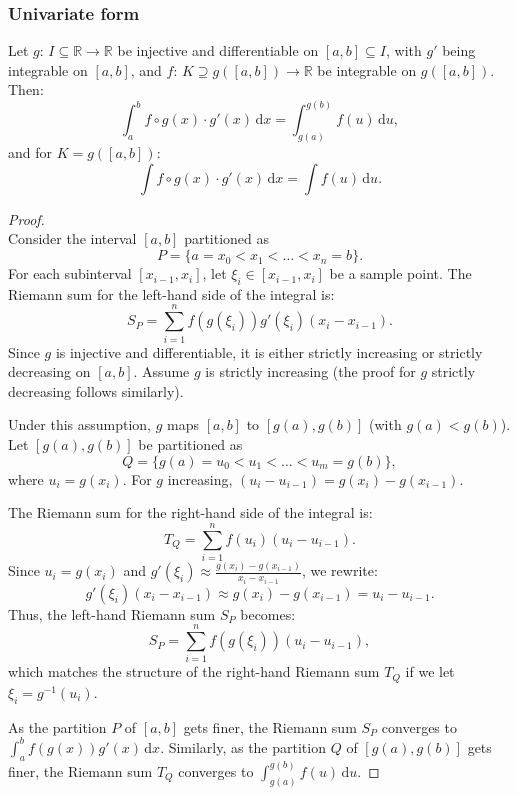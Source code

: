 \documentclass[a4paper,12pt]{report}
\begin{document}
\begin{itemize}
\begin{itemize}
\subsubsection{Univariate form}
Let $g:\,I\subseteq\mathbb{R}\to\mathbb{R}$ be injective and differentiable on $[a,b]\subseteq I$, with $g'$ being integrable on $[a,b]$, and $f:\,K\supseteq g([a,b])\to\mathbb{R}$ be integrable on $g([a,b])$. Then:
\[\int_a^bf\circ g(x)\cdot g'(x)\,\mathrm{d}x=\int_{g(a)}^{g(b)}f(u)\,\mathrm{d}u,\]
and for $K=g([a,b])$:
\[\int f\circ g(x)\cdot g'(x)\,\mathrm{d}x=\int f(u)\,\mathrm{d}u.\]
\begin{proof}\mbox{}\\
Consider the interval \([a, b]\) partitioned as
\[P = \{a = x_0 < x_1 < \dots  < x_n = b\}.\]
For each subinterval \([x_{i-1}, x_i]\), let \(\xi_i \in [x_{i-1}, x_i]\) be a sample point. The Riemann sum for the left-hand side of the integral is:
\[S_P = \sum_{i=1}^n f(g(\xi_i)) g'(\xi_i) (x_i - x_{i-1}).\]
Since \(g\) is injective and differentiable, it is either strictly increasing or strictly decreasing on \([a, b]\). Assume \(g\) is strictly increasing (the proof for \(g\) strictly decreasing follows similarly).

Under this assumption, \(g\) maps \([a, b]\) to \([g(a), g(b)]\) (with \(g(a) < g(b)\)). Let \([g(a), g(b)]\) be partitioned as
\[Q = \{g(a) = u_0 < u_1 < \dots  < u_m = g(b)\},\]
where \(u_i = g(x_i)\). For \(g\) increasing, \((u_i - u_{i-1}) = g(x_i) - g(x_{i-1})\).

The Riemann sum for the right-hand side of the integral is:
\[T_Q = \sum_{i=1}^n f(u_i) (u_i - u_{i-1}).\]
Since \(u_i = g(x_i)\) and \(g'(\xi_i) \approx \frac{g(x_i) - g(x_{i-1})}{x_i - x_{i-1}}\), we rewrite:
\[ g'(\xi_i) (x_i - x_{i-1}) \approx g(x_i) - g(x_{i-1}) = u_i - u_{i-1}. \]
Thus, the left-hand Riemann sum \(S_P\) becomes:
\[ S_P = \sum_{i=1}^n f(g(\xi_i)) (u_i - u_{i-1}),\]
which matches the structure of the right-hand Riemann sum \(T_Q\) if we let \(\xi_i = g^{-1}(u_i)\).

As the partition \(P\) of \([a, b]\) gets finer, the Riemann sum \(S_P\) converges to \(\int_a^b f(g(x)) g'(x) \, \mathrm{d}x\). Similarly, as the partition \(Q\) of \([g(a), g(b)]\) gets finer, the Riemann sum \(T_Q\) converges to \(\int_{g(a)}^{g(b)} f(u) \, \mathrm{d}u\).
\end{proof}

\end{itemize}
\end{itemize}
\end{document}
